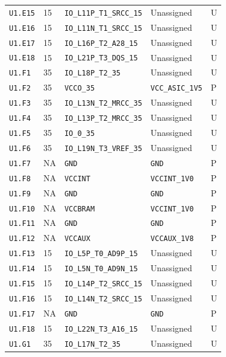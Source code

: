 \documentclass[11pt,a4paper]{article}
\begin{document}
\begin{longtable}{@{}P{20mm}P{10mm}P{75mm}P{49mm}P{7mm}@{}}
\nolinkurl{U1.E15} & 15 & \nolinkurl{IO_L11P_T1_SRCC_15} & Unassigned & U \\
\nolinkurl{U1.E16} & 15 & \nolinkurl{IO_L11N_T1_SRCC_15} & Unassigned & U \\
\nolinkurl{U1.E17} & 15 & \nolinkurl{IO_L16P_T2_A28_15} & Unassigned & U \\
\nolinkurl{U1.E18} & 15 & \nolinkurl{IO_L21P_T3_DQS_15} & Unassigned & U \\
\nolinkurl{U1.F1} & 35 & \nolinkurl{IO_L18P_T2_35} & Unassigned & U \\
\nolinkurl{U1.F2} & 35 & \nolinkurl{VCCO_35} & \nolinkurl{VCC_ASIC_1V5} & P \\
\nolinkurl{U1.F3} & 35 & \nolinkurl{IO_L13N_T2_MRCC_35} & Unassigned & U \\
\nolinkurl{U1.F4} & 35 & \nolinkurl{IO_L13P_T2_MRCC_35} & Unassigned & U \\
\nolinkurl{U1.F5} & 35 & \nolinkurl{IO_0_35} & Unassigned & U \\
\nolinkurl{U1.F6} & 35 & \nolinkurl{IO_L19N_T3_VREF_35} & Unassigned & U \\
\nolinkurl{U1.F7} & NA & \nolinkurl{GND} & \nolinkurl{GND} & P \\
\nolinkurl{U1.F8} & NA & \nolinkurl{VCCINT} & \nolinkurl{VCCINT_1V0} & P \\
\nolinkurl{U1.F9} & NA & \nolinkurl{GND} & \nolinkurl{GND} & P \\
\nolinkurl{U1.F10} & NA & \nolinkurl{VCCBRAM} & \nolinkurl{VCCINT_1V0} & P \\
\nolinkurl{U1.F11} & NA & \nolinkurl{GND} & \nolinkurl{GND} & P \\
\nolinkurl{U1.F12} & NA & \nolinkurl{VCCAUX} & \nolinkurl{VCCAUX_1V8} & P \\
\nolinkurl{U1.F13} & 15 & \nolinkurl{IO_L5P_T0_AD9P_15} & Unassigned & U \\
\nolinkurl{U1.F14} & 15 & \nolinkurl{IO_L5N_T0_AD9N_15} & Unassigned & U \\
\nolinkurl{U1.F15} & 15 & \nolinkurl{IO_L14P_T2_SRCC_15} & Unassigned & U \\
\nolinkurl{U1.F16} & 15 & \nolinkurl{IO_L14N_T2_SRCC_15} & Unassigned & U \\
\nolinkurl{U1.F17} & NA & \nolinkurl{GND} & \nolinkurl{GND} & P \\
\nolinkurl{U1.F18} & 15 & \nolinkurl{IO_L22N_T3_A16_15} & Unassigned & U \\
\nolinkurl{U1.G1} & 35 & \nolinkurl{IO_L17N_T2_35} & Unassigned & U \\

\end{longtable}
\end{document}
